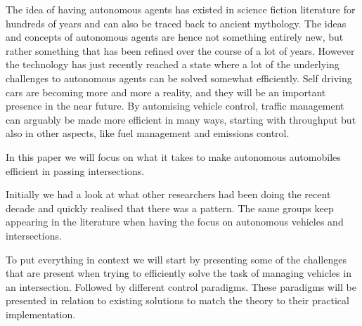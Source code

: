 
The idea of having autonomous agents has existed in science fiction literature for hundreds of years and can also be traced back to ancient mythology.
The ideas and concepts of autonomous agents are hence not something entirely new, but rather something that has been refined over the course of a lot of years.
However the technology has just recently reached a state where a lot of the underlying challenges to autonomous agents can be solved somewhat efficiently.
Self driving cars are becoming more and more a reality, and they will be an important presence in the near future.
By automising vehicle control, traffic management can arguably be made more efficient in many ways, starting with throughput but also in other aspects, like fuel management and emissions control. 

In this paper we will focus on what it takes to make autonomous automobiles efficient in passing intersections.

Initially we had a look at what other researchers had been doing the recent decade and quickly realised that there was a pattern. 
The same groups keep appearing in the literature when having the focus on autonomous vehicles and intersections.

To put everything in context we will start by presenting some of the challenges that are present when trying to efficiently solve the task of managing vehicles in an intersection.
Followed by different control paradigms. These paradigms will be presented in relation to existing solutions to match the theory to their practical implementation.
